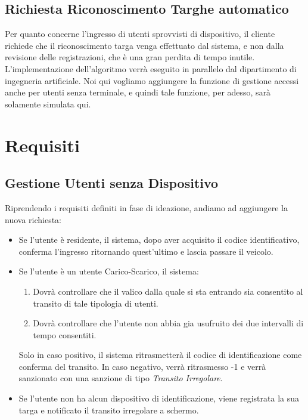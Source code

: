 \documentclass[12pt, letterpaper]{article}
\begin{document}
\subsection{Richiesta Riconoscimento Targhe automatico}
Per quanto concerne l'ingresso di utenti sprovvisti di 
dispositivo, il cliente richiede che il riconoscimento 
targa venga effettuato dal sistema, e non dalla revisione 
delle registrazioni, che è una gran perdita di tempo inutile.
L'implementazione dell'algoritmo verrà eseguito in parallelo 
dal dipartimento di ingegneria artificiale. Noi qui vogliamo
aggiungere la funzione di gestione accessi anche per utenti senza 
terminale, e quindi tale funzione, per adesso, sarà solamente 
simulata qui.

\section{Requisiti}

\subsection{Gestione Utenti senza Dispositivo}
Riprendendo i requisiti definiti in fase di ideazione,
andiamo ad aggiungere la nuova richiesta:
\begin{itemize}
    \item Se l'utente è residente, il sistema, 
    dopo aver acquisito il codice identificativo, 
    conferma l'ingresso ritornando quest'ultimo e 
    lascia passare il veicolo.
    \item Se l'utente è un utente Carico-Scarico, il sistema:
    \begin{enumerate}
        \item Dovrà controllare che il valico dalla 
        quale si sta entrando sia consentito al transito 
        di tale tipologia di utenti.
        \item Dovrà controllare che l'utente non 
        abbia gia usufruito dei due intervalli di 
        tempo consentiti.
    \end{enumerate}
    Solo in caso positivo, il sistema ritrasmetterà 
    il codice di identificazione come conferma del transito.
    In caso negativo, verrà ritrasmesso -1 e 
    verrà sanzionato con una sanzione di tipo 
    \emph{Transito Irregolare}.
    \item Se l'utente non ha alcun dispositivo di identificazione,
    viene registrata la sua targa e notificato il transito 
    irregolare a schermo.
\end{itemize}
\end{document}
